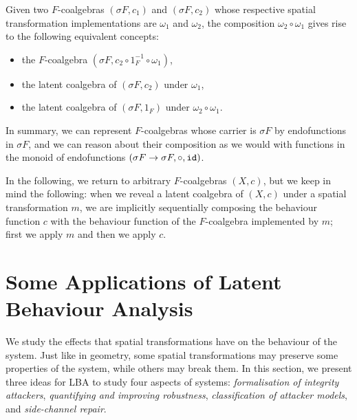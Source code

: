 Given two $F$-coalgebras $(\sigma F, c_1)$ and $(\sigma F, c_2)$ whose respective spatial transformation implementations are $\omega_1$ and $\omega_2$, the composition $\omega_2\circ \omega_1$ gives rise to the following equivalent concepts:
\begin{itemize}
    \item the $F$-coalgebra $(\sigma F, c_2\circ 1_F^{-1}\circ\omega_1)$,
    \item the latent coalgebra of $(\sigma F, c_2)$ under $\omega_1$,
    \item the latent coalgebra of $(\sigma F, 1_F)$ under $\omega_2\circ \omega_1$.
\end{itemize}
In summary, we can represent $F$-coalgebras whose carrier is $\sigma F$ by endofunctions in $\sigma F$, and we can reason about their composition as we would with functions in the monoid of endofunctions $(\sigma F\rightarrow \sigma F, \circ, {\texttt{id}})$. 

In the following, we return to arbitrary $F$-coalgebras $(X,c)$, but we keep in mind the following: when we reveal a latent coalgebra of $(X,c)$ under a spatial transformation $m$, we are implicitly sequentially composing the behaviour function $c$ with the behaviour function of the $F$-coalgebra implemented by $m$; first we apply $m$ and then we apply $c$.

\section{Some Applications of Latent Behaviour Analysis}
We study the effects that spatial transformations have on the behaviour of the system. Just like in geometry, some spatial transformations may preserve some properties of the system, while others may break them. In this section, we present three ideas for LBA to study four aspects of systems: \emph{formalisation of integrity attackers}, \emph{quantifying and improving robustness}, \emph{classification of attacker models}, and \emph{side-channel repair}.



